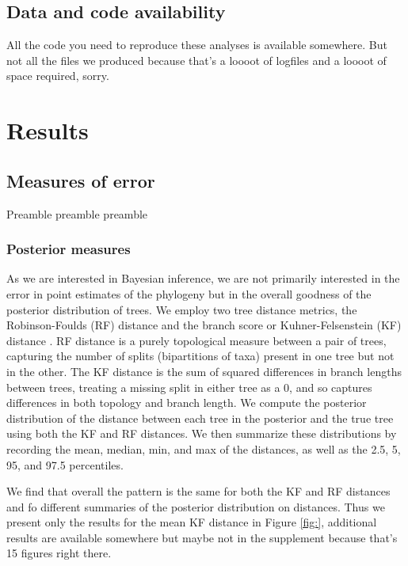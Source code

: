 \documentclass[11pt]{article}
\begin{document}
\subsection*{Data and code availability\label{sec:itsongithub}}
All the code you need to reproduce these analyses is available somewhere.
But not all the files we produced because that's a loooot of logfiles and a loooot of space required, sorry.

\section*{Results\label{sec:results}}

\subsection*{Measures of error\label{sec:error}}
Preamble preamble preamble

\subsubsection*{Posterior measures\label{sec:tree_dists}}
As we are interested in Bayesian inference, we are not primarily interested in the error in point estimates of the phylogeny but in the overall goodness of the posterior distribution of trees.
We employ two tree distance metrics, the Robinson-Foulds (RF) distance \citep{robinson1981comparison} and the branch score or Kuhner-Felsenstein (KF) distance \citep{kuhner1994simulation}.
RF distance is a purely topological measure between a pair of trees, capturing the number of splits (bipartitions of taxa) present in one tree but not in the other.
The KF distance is the sum of squared differences in branch lengths between trees, treating a missing split in either tree as a 0, and so captures differences in both topology and branch length.
We compute the posterior distribution of the distance between each tree in the posterior and the true tree using both the KF and RF distances.
We then summarize these distributions by recording the mean, median, min, and max of the distances, as well as the 2.5, 5, 95, and 97.5 percentiles.

We find that overall the pattern is the same for both the KF and RF distances and fo different summaries of the posterior distribution on distances.
Thus we present only the results for the mean KF distance in Figure \ref{fig:}, additional results are available somewhere but maybe not in the supplement because that's 15 figures right there.
\end{document}
